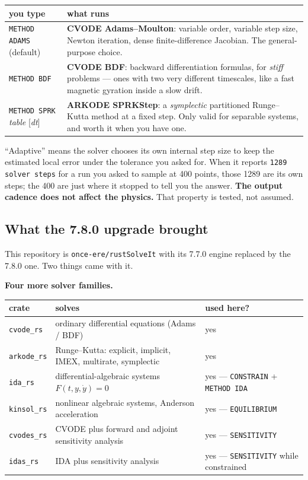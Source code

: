 \documentclass[11pt]{article}
\newcommand{\kw}[1]{\texttt{\uppercase{#1}}}
\newcommand{\code}[1]{\texttt{#1}}
\begin{document}
\begin{center}
\begin{tabular}{p{4.2cm}p{10.4cm}}
\textbf{you type} & \textbf{what runs}\\\hline
\kw{method adams} (default) & \textbf{CVODE Adams--Moulton}: variable
order, variable step size, Newton iteration, dense finite-difference
Jacobian. The general-purpose choice.\\
\kw{method bdf} & \textbf{CVODE BDF}: backward differentiation formulas,
for \emph{stiff} problems --- ones with two very different timescales,
like a fast magnetic gyration inside a slow drift.\\
\kw{method sprk} \emph{table} [\emph{dt}] & \textbf{ARKODE SPRKStep}: a
\emph{symplectic} partitioned Runge--Kutta method at a fixed step. Only
valid for separable systems, and worth it when you have one.\\
\end{tabular}
\end{center}

``Adaptive'' means the solver chooses its own internal step size to keep
the estimated local error under the tolerance you asked for. When it
reports \code{1289 solver steps} for a run you asked to sample at 400
points, those 1289 are its own steps; the 400 are just where it stopped
to tell you the answer. \textbf{The output cadence does not affect the
physics.} That property is tested, not assumed.

\subsection{What the 7.8.0 upgrade brought}

This repository is \code{once-ere/rustSolveIt} with its 7.7.0 engine
replaced by the 7.8.0 one. Two things came with it.

\textbf{Four more solver families.}

\begin{center}
\begin{tabular}{lll}
\textbf{crate} & \textbf{solves} & \textbf{used here?}\\\hline
\code{cvode\_rs}  & ordinary differential equations (Adams / BDF) & yes\\
\code{arkode\_rs} & Runge--Kutta: explicit, implicit, IMEX, multirate, symplectic & yes\\
\code{ida\_rs}    & differential-algebraic systems $F(t,y,\dot y)=0$ & yes --- \kw{constrain} + \kw{method ida}\\
\code{kinsol\_rs} & nonlinear algebraic systems, Anderson acceleration & yes --- \kw{equilibrium}\\
\code{cvodes\_rs} & CVODE plus forward and adjoint sensitivity analysis & yes --- \kw{sensitivity}\\
\code{idas\_rs}   & IDA plus sensitivity analysis & yes --- \kw{sensitivity} while constrained\\
\end{tabular}
\end{center}
\end{document}
